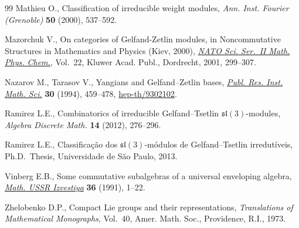 \documentclass[pdftex]{sigma}
\numberwithin{equation}{section}
\begin{document}
\begin{thebibliography}{99}
Mathieu O., Classif\/ication of irreducible weight modules, \textit{Ann. Inst.
  Fourier (Grenoble)} \textbf{50} (2000), 537--592.

Mazorchuk V., On categories of {G}elfand-{Z}etlin modules, in Noncommutative
  Structures in Mathematics and Physics ({K}iev, 2000), \href{http://dx.doi.org/10.1007/978-94-010-0836-5_24}{\textit{NATO Sci.
  Ser.~II Math. Phys. Chem.}}, Vol.~22, Kluwer Acad. Publ., Dordrecht, 2001,
  299--307.

Nazarov M., Tarasov V., Yangians and {G}elfand--{Z}etlin bases, \href{http://dx.doi.org/10.2977/prims/1195165907}{\textit{Publ.
  Res. Inst. Math. Sci.}} \textbf{30} (1994), 459--478, \href{http://arxiv.org/abs/hep-th/9302102}{hep-th/9302102}.

Ramirez L.E., Combinatorics of irreducible {G}elfand--{T}setlin
  {${\mathfrak{sl}}(3)$}-modules, \textit{Algebra Discrete Math.} \textbf{14}
  (2012), 276--296.

Ramirez L.E., Classif\/ica\c{c}\~ao dos $\mathfrak{sl}(3)$-m\'odulos de
  Gelfand--Tsetlin irredut\'iveis, Ph.D.~Thesis, Universidade de S\~ao Paulo,
  2013.

Vinberg E.B., Some commutative subalgebras of a universal enveloping algebra,
  \href{http://dx.doi.org/10.1070/IM1991v036n01ABEH001925}{\textit{Math. USSR Izvestiya}} \textbf{36} (1991), 1--22.

Zhelobenko D.P., Compact Lie groups and their representations,
  \textit{Translations of Mathematical Monographs}, Vol.~40, Amer. Math. Soc.,
  Providence, R.I., 1973.

\end{thebibliography}\LastPageEnding
\end{document}
